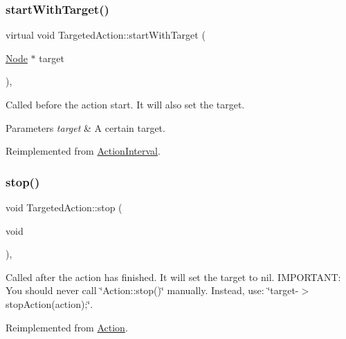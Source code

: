 \subsubsection{\texorpdfstring{start\+With\+Target()}{startWithTarget()}\hspace{0.1cm}{\footnotesize\ttfamily [2/2]}}
{\footnotesize\ttfamily virtual void Targeted\+Action\+::start\+With\+Target (\begin{DoxyParamCaption}\item[{\hyperlink{classNode}{Node} $\ast$}]{target }\end{DoxyParamCaption})\hspace{0.3cm}{\ttfamily [override]}, {\ttfamily [virtual]}}

Called before the action start. It will also set the target.


\begin{DoxyParams}{Parameters}
{\em target} & A certain target. \\
\hline
\end{DoxyParams}


Reimplemented from \hyperlink{classActionInterval_ad3d91186b2c3108488ddbbdbbd982484}{Action\+Interval}.

\mbox{\label{classTargetedAction_a688769917c245a9f885bbe49a73e37fa}} 
\subsubsection{\texorpdfstring{stop()}{stop()}\hspace{0.1cm}{\footnotesize\ttfamily [1/2]}}
{\footnotesize\ttfamily void Targeted\+Action\+::stop (\begin{DoxyParamCaption}\item[{void}]{ }\end{DoxyParamCaption})\hspace{0.3cm}{\ttfamily [override]}, {\ttfamily [virtual]}}

Called after the action has finished. It will set the \textquotesingle{}target\textquotesingle{} to nil. I\+M\+P\+O\+R\+T\+A\+NT\+: You should never call \char`\"{}\+Action\+::stop()\char`\"{} manually. Instead, use\+: \char`\"{}target-\/$>$stop\+Action(action);\char`\"{}. 

Reimplemented from \hyperlink{classAction_a968267fa7a1dcc46a2976249a712d3c8}{Action}.


